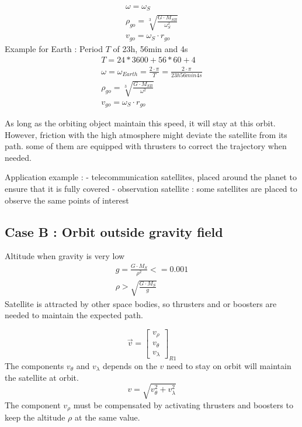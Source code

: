 \documentclass[12pt,a4paper]{article}
\begin{document}
\begin{eqnarray}
	\omega = \omega_{S}\\
	\rho_{go} = \sqrt[3]{\frac{ G \cdot M_{SB}}{\omega_{S}^2}}\\
	v_{go} = \omega_{S} \cdot r_{go}
\end{eqnarray}
Example for Earth : Period $T$ of 23h, 56min and 4s
\begin{eqnarray}
	T = 24*3600 + 56 * 60 + 4\\
	\omega = \omega_{Earth}= \frac{2 \cdot \pi}{T} = \frac{2 \cdot \pi}{23h 56min 4s}\\
	\rho_{go} = \sqrt[3]{\frac{ G \cdot M_{SB}}{\omega^2}}\\
	v_{go} = \omega_{S} \cdot r_{go}
\end{eqnarray}

As long as the orbiting object maintain this speed, it will stay at this orbit. However, friction with the high atmosphere might deviate the satellite from its path. some of them are equipped with thrusters to correct the trajectory when needed. 

Application example : 
- telecommunication satellites, placed around the planet to ensure that it is fully covered
- observation satellite : some satellites are placed to observe the same points of interest

\subsection{Case B : Orbit outside gravity field}
Altitude when gravity is very low
\begin{eqnarray}
	g = \frac{G \cdot M_S}{\rho ^2} <= 0.001\\
	\rho > \sqrt{\frac{G \cdot M_S}{g}}
\end{eqnarray}
Satellite is attracted by other space bodies, so thrusters and or boosters are needed to maintain the expected path. 

\begin{equation}
	\vec{v} = 	\begin{bmatrix}
		v_{\rho} \\
		v_{\theta}\\
		v_{\lambda}
	\end{bmatrix}_{R1}
\end{equation}
The components $v_{\theta}$ and $v_{\lambda}$ depends on the $v$ need to stay on orbit will maintain the satellite at orbit.
\begin{equation}
	v = \sqrt{v_{\theta}^2 + v_{\lambda}^2}
\end{equation}
The component $v_{\rho}$ must be compensated by activating thrusters and boosters to keep the altitude $\rho$ at the same value.
\end{document}
